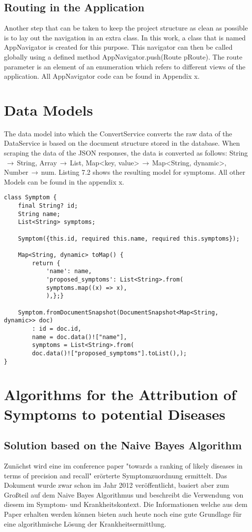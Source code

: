 \subsection{Routing in the Application}
Another step that can be taken to keep the project structure as clean as possible is to lay out the navigation in an extra class. In this work, a class that is named AppNavigator is created for this purpose. This navigator can then be called globally using a defined method AppNavigator.push(Route pRoute). The route parameter is an element of an enumeration which refers to different views of the application. All AppNavigator code can be found in Appendix x.
\section{Data Models}
The data model into which the ConvertService converts the raw data of the DataService is based on the document structure stored in the database. When scraping the data of the JSON responses, the data is converted as follows: String$\,\to\,$String, Array$\,\to\,$List, Map<key, value>$\,\to\,$Map<String, dynamic>, Number$\,\to\,$num. Listing 7.2 shows the resulting model for symptoms. All other Models can be found in the appendix x.
\scriptsize
\begin{lstlisting}[caption=Model for Symptoms]
class Symptom {
	final String? id;
	String name;
	List<String> symptoms;
	
	Symptom({this.id, required this.name, required this.symptoms});
	
	Map<String, dynamic> toMap() {
		return {
			'name': name,
			'proposed_symptoms': List<String>.from(
			symptoms.map((x) => x),
			),};}
	
	Symptom.fromDocumentSnapshot(DocumentSnapshot<Map<String, dynamic>> doc)
		: id = doc.id,
		name = doc.data()!["name"],
		symptoms = List<String>.from(
		doc.data()!["proposed_symptoms"].toList(),);	
}
\end{lstlisting}
\normalsize


\section{Algorithms for the Attribution of Symptoms to potential Diseases}
\subsection{Solution based on the Naive Bayes Algorithm}
Zunächst wird eine im conference paper "towards a ranking of likely diseases in terms of precision and recall" erörterte Symptomzuordnung ermittelt. Das Dokument wurde zwar schon im Jahr 2012 veröffentlicht, basiert aber zum Großteil auf dem Naive Bayes Algorithmus und beschreibt die Verwendung von diesem im Symptom- und Krankheitskontext. Die Informationen welche aus dem Paper erhalten werden können bieten auch heute noch eine gute Grundlage für eine algorithmische Lösung der Krankheitsermittlung.
